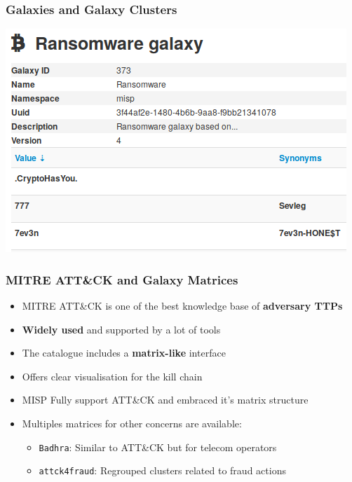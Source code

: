 \begin{frame}
    \frametitle{Galaxies and Galaxy Clusters}
    \includegraphics[width=1.0\linewidth]{pictures/galaxy-ransomware.png}
\end{frame}

\begin{frame}
    \frametitle{MITRE ATT\&CK and Galaxy Matrices}
    \begin{itemize}
        \item MITRE ATT\&CK is one of the best knowledge base of \textbf{adversary TTPs}
        \item \textbf{Widely used} and supported by a lot of tools
        \item The catalogue includes a \textbf{matrix-like} interface
        \item Offers clear visualisation for the kill chain
    \end{itemize}

    \vspace{12px}
    \begin{itemize}
        \item MISP Fully support ATT\&CK and embraced it's matrix structure
        \item Multiples matrices for other concerns are available:
        \begin{itemize}
            \item \texttt{Badhra}: Similar to ATT\&CK but for telecom operators
            \item \texttt{attck4fraud}: Regrouped clusters related to fraud actions
        \end{itemize}
    \end{itemize}
\end{frame}

